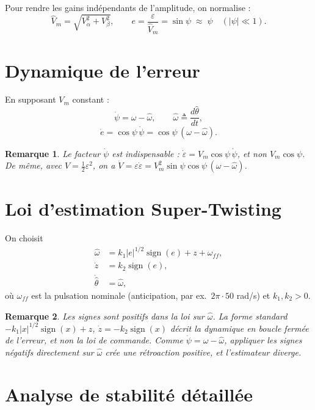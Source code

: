 \documentclass[11pt,a4paper]{article}
\newtheorem{remarque}{Remarque}
\newcommand{\sign}{\operatorname{sign}}
\newcommand{\hth}{\hat{\theta}}
\newcommand{\hw}{\hat{\omega}}
\begin{document}
Pour rendre les gains indépendants de l'amplitude, on normalise :
\begin{equation}
\hat V_m = \sqrt{V_\alpha^2+V_\beta^2}, \qquad
e = \frac{\varepsilon}{\hat V_m} = \sin\psi \;\approx\; \psi \quad (|\psi|\ll 1).
\end{equation}

\section{Dynamique de l'erreur}

En supposant $V_m$ constant :
\begin{equation}
\dot\psi = \omega - \hw, \qquad \hw \triangleq \frac{d\hth}{dt},
\end{equation}
\begin{equation}
\dot e = \cos\psi\,\dot\psi = \cos\psi\,(\omega-\hw).
\end{equation}

\begin{remarque}
Le facteur $\dot\psi$ est indispensable : $\dot\varepsilon = V_m\cos\psi\,\dot\psi$, et non $V_m\cos\psi$.
De même, avec $V=\tfrac12\varepsilon^2$, on a
$\dot V = \varepsilon\dot\varepsilon = V_m^2\sin\psi\cos\psi\,(\omega-\hw)$.
\end{remarque}

\section{Loi d'estimation Super-Twisting}

On choisit
\begin{align}
\hw &= k_1 |e|^{1/2}\sign(e) + z + \omega_{ff}, \\
\dot z &= k_2 \sign(e), \\
\dot{\hth} &= \hw ,
\end{align}
où $\omega_{ff}$ est la pulsation nominale (anticipation, par ex.\ $2\pi\cdot 50$ rad/s)
et $k_1,k_2>0$.

\begin{remarque}
Les signes sont \emph{positifs} dans la loi sur $\hw$. La forme standard
$-k_1|x|^{1/2}\sign(x) + z$, $\dot z = -k_2\sign(x)$ décrit la dynamique
\emph{en boucle fermée} de l'erreur, et non la loi de commande. Comme
$\dot\psi = \omega-\hw$, appliquer les signes négatifs directement sur $\hw$
crée une rétroaction positive, et l'estimateur diverge.
\end{remarque}

\section{Analyse de stabilité détaillée}
\end{document}
